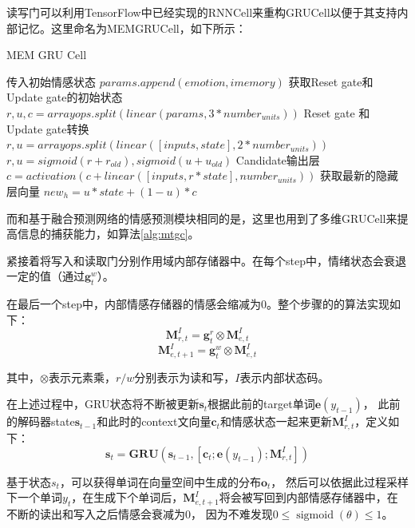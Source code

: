 \documentclass[supercite]{HustGraduPaper}
\theoremstyle{definition}
\begin{document}
读写门可以利用TensorFlow中已经实现的RNNCell来重构GRUCell以便于其支持内部记忆。这里命名为MEMGRUCell，如下所示：
\begin{algorithm}
  \caption{MEM GRU Cell}
  \label{alg:mgc}
  \begin{algorithmic}
    \State 传入初始情感状态
    \State $params.append(emotion,imemory)$
    \State 获取Reset gate和Update gate的初始状态
    \State $r, u, c = arrayops.split(linear(params, 3 * number_{units}))$
    \State Reset gate 和 Update gate转换
    \State $r, u = arrayops.split(linear([inputs, state], 2 * number_{units}))$
    \State $r, u = sigmoid(r+r_{old}), sigmoid(u+u_{old})$
    \State Candidate输出层
    \State $c = activation(c+linear([inputs, r * state], number_{units}))$
    \State 获取最新的隐藏层向量
    \State $new_h = u * state + (1 - u) * c$
  \end{algorithmic}
\end{algorithm}

而和基于融合预测网络的情感预测模块相同的是，这里也用到了多维GRUCell来提高信息的捕获能力，如算法\ref{alg:mtgc}。

紧接着将写入和读取门分别作用域内部存储器中。在每个step中，情绪状态会衰退一定的值（通过$\boldsymbol{g}_t^w$）。

在最后一个step中，内部情感存储器的情感会缩减为0。整个步骤的的算法实现如下：
$$\boldsymbol { M } _ { r , t } ^ { I } = \boldsymbol { g } _ { t } ^ { r } \otimes \boldsymbol { M } _ { e , t } ^ { I }$$
$$\boldsymbol { M } _ { e , t + 1 } ^ { I } = \boldsymbol { g } _ { t } ^ { w } \otimes \boldsymbol { M } _ { e , t } ^ { I }$$

其中，$\otimes$表示元素乘，$r/w$分别表示为读和写，$I$表示内部状态码。

在上述过程中，GRU状态将不断被更新$\boldsymbol{s}_t$根据此前的target单词$\boldsymbol{e}(y_{t-1})$，
此前的解码器state$\boldsymbol{s}_{t-1}$和此时的context文向量$\boldsymbol{c}_t$和情感状态一起来更新$\boldsymbol{M}_{r,t}^I$，定义如下：
$$\boldsymbol { s } _ { t } = \mathbf { G } \mathbf { R } \mathbf { U } \left( \boldsymbol { s } _ { t - 1 } , \left[ \boldsymbol { c } _ { t } ; \boldsymbol { e } \left( y _ { t - 1 } \right) ; \boldsymbol { M } _ { r , t } ^ { I } \right] \right)$$

基于状态$s_t$，可以获得单词在向量空间中生成的分布$\boldsymbol{o}_t$，
然后可以依据此过程采样下一个单词$y_t$，在生成下个单词后，$\boldsymbol{M}_{e,t+1}^I$将会被写回到内部情感存储器中，在不断的读出和写入之后情感会衰减为0，
因为不难发现$0 \leq \operatorname { sigmoid } ( \theta ) \leq 1$。
\end{document}
